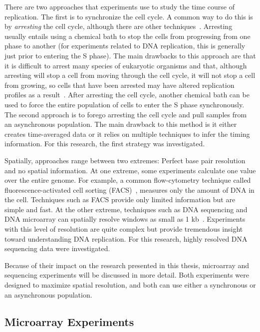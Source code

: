 	There are two approaches that experiments use to study the time course of replication.
	The first is to synchronize the cell cycle.
	A common way to do this is by \emph{arresting} the cell cycle, although there are other techniques~\cite{CellCycleSynch}.
	Arresting usually entails using a chemical bath to stop the cells from progressing from one phase to another (for experiments related to DNA replication, this is generally just prior to entering the S phase).
	The main drawbacks to this approach are that  it is difficult to arrest many species of eukaryotic organisms and that, although arresting will stop a cell from moving through the cell cycle, it will not stop a cell from growing, so cells that have been arrested may have altered replication profiles as a result~\cite{CellCycleSynch}.
	After arresting the cell cycle, another chemical bath can be used to force the entire population of cells to enter the S phase synchronously.
	The second approach is to forego arresting the cell cycle and pull samples from an asynchronous population.
	The main drawback to this method is it either creates time-averaged data or it relies on multiple techniques to infer the timing information.
	For this research, the first strategy was investigated.
	
	Spatially, approaches range between two extremes: Perfect base pair resolution and no spatial information.
	At one extreme, some experiments calculate one value over the entire genome. 
	For example, a common flow-cytometry technique called fluorescence-activated cell sorting (FACS)~\cite{DeepSeq, SequencingReview}, measures only the amount of DNA in the cell.
	Techniques such as FACS provide only limited information but are simple and fast.
	At the other extreme, techniques such as DNA sequencing and DNA microarray can spatially resolve windows as small as 1 kb~\cite{DeepSeq}.
	Experiments with this level of resolution are quite complex but provide tremendous insight toward understanding DNA replication.
	For this research, highly resolved DNA sequencing data were investigated.
	
	Because of their impact on the research presented in this thesis, microarray and sequencing experiments will be discussed in more detail.
	Both experiments were designed to maximize spatial resolution, and both can use either a synchronous or an asynchronous population.
	
	
		\subsection{Microarray Experiments}
		\label{subsec:Microarray}
		
